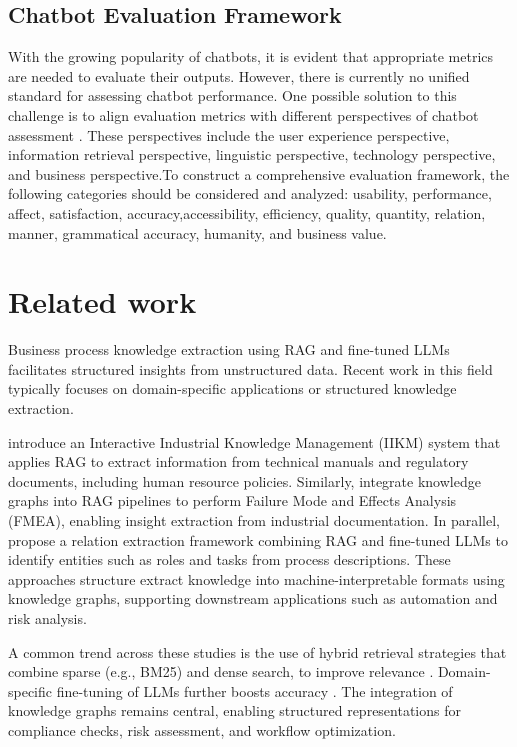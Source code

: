 \documentclass[%
    paper=A4,                    %
    twoside=true,               %
    openright,                  %
    parskip=full,               %
    chapterprefix=true,         %
    11pt,                       %
    headings=normal,            %
    bibliography=totoc,         %
    listof=totoc,              %
    titlepage=on,              %
    captions=tableabove,        %
    draft=false,               %
]{scrreprt}%
\begin{document}
\section{Chatbot Evaluation Framework}

With the growing popularity of chatbots, it is evident that appropriate metrics are needed to evaluate their outputs. However, there is currently no unified standard for assessing chatbot performance. One possible solution to this challenge is to align evaluation metrics with different perspectives of chatbot assessment \cite{peras2018chatbot}. These perspectives include the user experience perspective, information retrieval perspective, linguistic perspective, technology perspective, and business perspective.To construct a comprehensive evaluation framework, the following categories should be considered and analyzed: usability, performance, affect, satisfaction, accuracy,accessibility, efficiency, quality, quantity, relation, manner, grammatical accuracy, humanity, and business value.

\chapter{Related work}


\label{related_work}

Business process knowledge extraction using RAG and fine-tuned LLMs facilitates structured insights from unstructured data. Recent work in this field typically focuses on domain-specific applications or structured knowledge extraction.

\citet{chen2025application} introduce an Interactive Industrial Knowledge Management (IIKM) system that applies RAG to extract information from technical manuals and regulatory documents, including human resource policies. Similarly, \citet{bahr2025knowledge} integrate knowledge graphs into RAG pipelines to perform Failure Mode and Effects Analysis (FMEA), enabling insight extraction from industrial documentation. In parallel, \citet{efeoglu2024retrieval} propose a relation extraction framework combining RAG and fine-tuned LLMs to identify entities such as roles and tasks from process descriptions. These approaches structure extract knowledge into machine-interpretable formats using knowledge graphs, supporting downstream applications such as automation and risk analysis.

A common trend across these studies is the use of hybrid retrieval strategies that combine sparse (e.g., BM25) and dense search, to improve relevance \citep{chen2025application}. Domain-specific fine-tuning of LLMs further boosts accuracy \citep{chen2025application, efeoglu2024retrieval, bahr2025knowledge}. The integration of knowledge graphs remains central, enabling structured representations for compliance checks, risk assessment, and workflow optimization.
\end{document}

